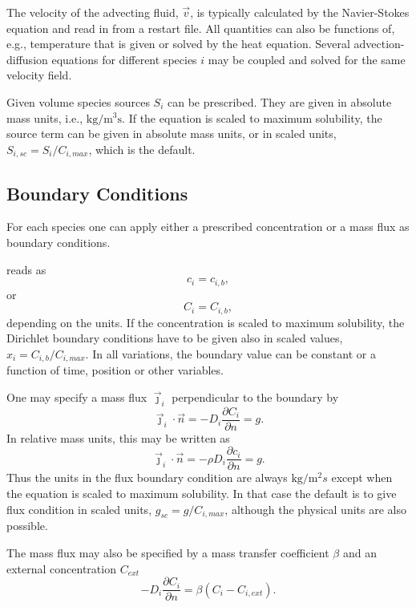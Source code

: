\begin{versiona}
The velocity of the advecting fluid, $\vec v$, is typically calculated by
the Navier-Stokes equation and read in from a restart file. All quantities can
also be functions of, e.g., temperature that is given or solved by the heat
equation. Several advection-diffusion equations for different species $i$ may
be coupled and solved for the same velocity field.

Given volume species sources $S_i$ can be prescribed. They are given
in absolute mass units, i.e., $\mathrm{kg}/\mathrm{m}^3\mathrm{s}$.
If the equation is scaled to maximum solubility, the source term can
be given in absolute mass units, or in scaled units, $S_{i,sc} = S_i /
C_{i,max}$, which is the default.


\subsection{Boundary Conditions}

For each species one can apply either a prescribed concentration or a mass
flux as boundary conditions.

 reads as
\begin{equation}
c_i=c_{i,b},
\end{equation}
or
\begin{equation}
C_i=C_{i,b},
\end{equation}
depending on the units. If the concentration is scaled to maximum
solubility, the Dirichlet boundary conditions have to be given also in
scaled values, $x_i = C_{i,b}/C_{i,max}$. In all variations, the
boundary value can be constant or a function of time, position or
other variables.

One may specify a mass flux $\vec{\jmath}_i$ perpendicular to the boundary by
\begin{equation}
\vec{\jmath}_i\cdot\vec{n} = -D_i\frac{\partial C_i}{\partial n} = g.
\end{equation}
In relative mass units, this may be written as
\begin{equation}
\vec{\jmath}_i\cdot\vec{n} = -\rho D_i\frac{\partial c_i}{\partial n} = g.
\end{equation}
Thus the units in the flux boundary condition are always
$\mathrm{kg}/\mathrm{m}^2s$ except when the equation is scaled to
maximum solubility. In that case the default is to give flux condition
in scaled units, $g_{sc} = g/C_{i,max}$, although the physical
units are also possible.

The mass flux may also be specified by a mass transfer coefficient
$\beta$ and an external concentration $C_{ext}$
\begin{equation}
-D_i\frac{\partial C_i}{\partial n} = \beta(C_i-C_{i,ext}).
\end{equation}


\end{versiona}
